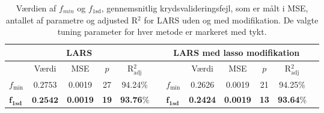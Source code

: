 \begin{table}
\center
\begin{tabular}{lccccc | lccccc}
\toprule
 \multicolumn{5}{c}{LARS} & \multicolumn{1}{c}{ }&   \multicolumn{5}{c}{LARS med lasso modifikation}  \\ \midrule
& Værdi & MSE & $p$ &R$^2_{\text{adj}}$ && & Værdi & MSE & $p$ & R$^2_{\text{adj}}$\\
$f_{\text{min}}$ & $0.2753$ &  0.0019 & 27 &94.24\% & & \(f_{\min}\) &  0.2626 & 0.0019 & 21  & 94.25\% \\
$\boldsymbol{f}_{\textbf{1sd}}$ & $\textbf{0.2542} $ & \textbf{0.0019} & \textbf{19} & \textbf{93.76}\%&&$\boldsymbol{f}_{\textbf{1sd}}$ & \textbf{0.2424} & \textbf{0.0019} & \textbf{13 } & \textbf{93.64}\% \\ \bottomrule
 \end{tabular}
\caption{Værdien af $f_{min}$ og $f_{1\text{sd}}$, gennemsnitlig krydsvalideringsfejl, som er målt i MSE, antallet af parametre og adjusted R$^2$ for LARS uden og med modifikation. De valgte tuning parameter for hver metode er markeret med tykt.} \label{tab:lars_lasso_tab}
\end{table}
